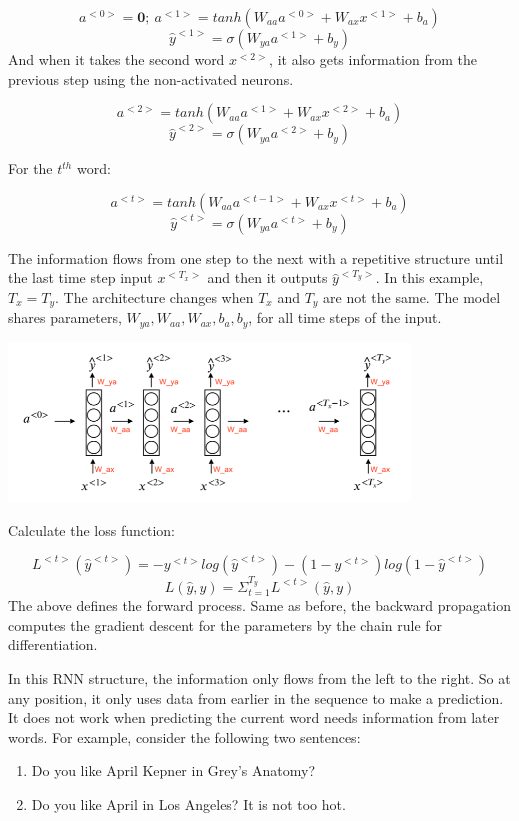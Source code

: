 \documentclass[
  12pt,
]{krantz}
\providecommand{\tightlist}{%
  \setlength{\itemsep}{0pt}\setlength{\parskip}{0pt}}
\begin{document}
\[a^{<0>} = \mathbf{0};\ a^{<1>} = tanh(W_{aa}a^{<0>} + W_{ax}x^{<1>}+b_a)\]
\[\hat{y}^{<1>} = \sigma(W_{ya}a^{<1>}+b_y)\]
And when it takes the second word \(x^{<2>}\), it also gets information from the previous step using the non-activated neurons.

\[a^{<2>} = tanh(W_{aa}a^{<1>}+W_{ax}x^{<2>}+b_a)\]
\[\hat{y}^{<2>} = \sigma(W_{ya}a^{<2>}+b_y)\]

For the \(t^{th}\) word:

\[a^{<t>} = tanh(W_{aa}a^{<t-1>}+W_{ax}x^{<t>}+b_a)\]
\[\hat{y}^{<t>} = \sigma(W_{ya}a^{<t>}+b_y)\]

The information flows from one step to the next with a repetitive structure until the last time step input \(x^{<T_x>}\) and then it outputs \(\hat{y}^{<T_y>}\). In this example, \(T_x = T_y\). The architecture changes when \(T_x\) and \(T_y\) are not the same. The model shares parameters, \(W_{ya}, W_{aa}, W_{ax},b_a, b_y\), for all time steps of the input.

\includegraphics[width=0.8\textwidth,height=\textheight]{images/RNN_pro.png}

Calculate the loss function:

\[L^{<t>}(\hat{y}^{<t>}) = -y^{<t>}log(\hat{y}^{<t>})-(1-y^{<t>})log(1-\hat{y}^{<t>})\]
\[L(\hat{y},y)=\Sigma_{t=1}^{T_y}L^{<t>}(\hat{y},y)\]
The above defines the forward process. Same as before, the backward propagation computes the gradient descent for the parameters by the chain rule for differentiation.

In this RNN structure, the information only flows from the left to the right. So at any position, it only uses data from earlier in the sequence to make a prediction. It does not work when predicting the current word needs information from later words. For example, consider the following two sentences:

\begin{enumerate}
\def\labelenumi{\arabic{enumi}.}
\tightlist
\item
  Do you like April Kepner in Grey's Anatomy?
\item
  Do you like April in Los Angeles? It is not too hot.
\end{enumerate}
\end{document}

